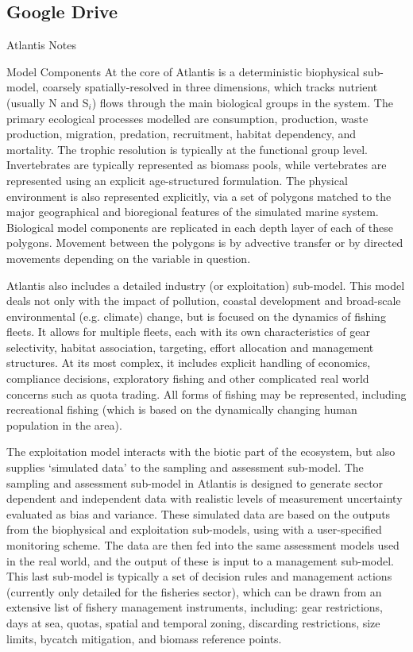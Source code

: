 \documentclass{report}
\begin{document}
\subsection{Google Drive}

              
Atlantis Notes

Model Components
At the core of Atlantis is a deterministic biophysical sub-model, coarsely spatially-resolved in three dimensions, which tracks nutrient (usually N and S$_i$) flows through the main biological groups in the system. The primary ecological processes modelled are consumption, production, waste production, migration, predation, recruitment, habitat dependency, and mortality. The trophic resolution is typically at the functional group level. Invertebrates are typically represented as biomass pools, while vertebrates are represented using an explicit age-structured formulation. The physical environment is also represented explicitly, via a set of polygons matched to the major geographical and bioregional features of the simulated marine system. Biological model components are replicated in each depth layer of each of these polygons. Movement between the polygons is by advective transfer or by directed movements depending on the variable in question.

Atlantis also includes a detailed industry (or exploitation) sub-model. This model deals not only with the impact of pollution, coastal development and broad-scale environmental (e.g. climate) change, but is focused on the dynamics of fishing fleets. It allows for multiple fleets, each with its own characteristics of gear selectivity, habitat association, targeting, effort allocation and management structures. At its most complex, it includes explicit handling of economics, compliance decisions, exploratory fishing and other complicated real world concerns such as quota trading. All forms of fishing may be represented, including recreational fishing (which is based on the dynamically changing human population in the area).

The exploitation model interacts with the biotic part of the ecosystem, but also supplies ‘simulated data’ to the sampling and assessment sub-model. The sampling and assessment sub-model in Atlantis is designed to generate sector dependent and independent data with realistic levels of measurement uncertainty evaluated as bias and variance. These simulated data are based on the outputs from the biophysical and exploitation sub-models, using with a user-specified monitoring scheme. The data are then fed into the same assessment models used in the real world, and the output of these is input to a management sub-model. This last sub-model is typically a set of decision rules and management actions (currently only detailed for the fisheries sector), which can be drawn from an extensive list of fishery management instruments, including: gear restrictions, days at sea, quotas, spatial and temporal zoning, discarding restrictions, size limits, bycatch mitigation, and biomass reference points.
\end{document}
